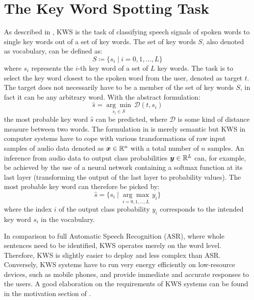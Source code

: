
\section{The Key Word Spotting Task}\label{sec:intro_kws}
As described in , KWS is the task of classifying speech signals of spoken words to single key words out of a set of key words.
The set of key words $S$, also denoted as vocabulary, can be defined as:
\begin{equation}\label{eq:intro_kws_dict}
	S \coloneqq \{s_i \mid i = 0, 1, \dots, L\}
\end{equation}
where $s_i$ represents the $i$-th key word of a set of $L$ key words.
The task is to select the key word closest to the spoken word from the user, denoted as target $t$.
The target does not necessarily have to be a member of the set of key words $S$, in fact it can be any arbitrary word.
With the abstract formulation:
\begin{equation}\label{eq:intro_kws_task}
	\hat{s} = \underset{s_i \in S}{\arg \min} \, \mathcal{D}(t, s_i)
\end{equation}
the most probable key word $\hat{s}$ can be predicted, where $\mathcal{D}$ is some kind of distance measure between two words.
The formulation in  is merely semantic but KWS in computer systems have to cope with various transformations of raw input samples of audio data denoted as $\bm{x} \in \mathbb{R}^n$ with a total number of $n$ samples.
An inference from audio data to output class probabilities $\bm{y} \in \mathbb{R}^L$ can, for example, be achieved by the use of a neural network containing a softmax function at its last layer (transforming the output of the last layer to probability values).
The most probable key word can therefore be picked by:
\begin{equation}\label{eq:intro_kws_class}
	\hat{s} = \{s_i \mid \underset{i = 0, 1, \dots, L}{\arg \max} \, y_i\}
\end{equation}
where the index $i$ of the output class probability $y_i$ corresponds to the intended key word $s_i$ in the vocabulary.

In comparison to full Automatic Speech Recognition (ASR), where whole sentences need to be identified, KWS operates merely on the word level.
Therefore, KWS is slightly easier to deploy and less complex than ASR.
Conversely, KWS systems have to run very energy efficiently on low-resource devices, such as mobile phones, and provide immediate and accurate responses to the users.
A good elaboration on the requirements of KWS systems can be found in the motivation section of \cite{Warden2018}.